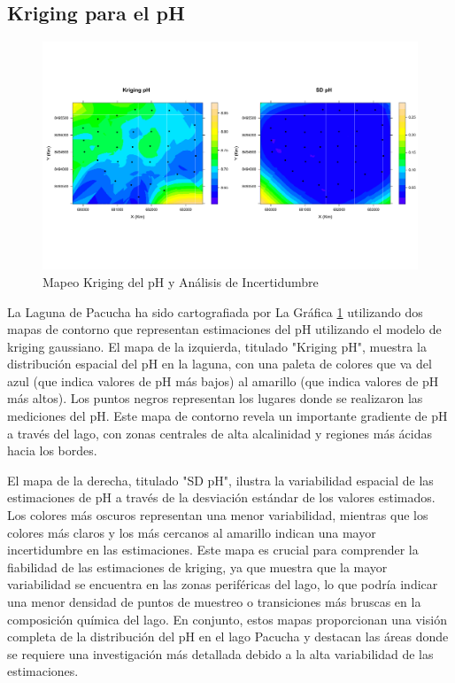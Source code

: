 \subsection{Kriging para el pH}
\begin{figure}[!htb]
    \centering
    \includegraphics[width=0.9\linewidth]{Figuras_AED/ESTIMACION/PH_KRIGING.pdf}
    \caption{Mapeo Kriging del pH y Análisis de Incertidumbre }
    \label{fig:enter- kring_t55}
\end{figure}

 La Laguna de Pacucha ha sido cartografiada por La Gráfica \ref{fig:enter- kring_t55} utilizando dos mapas de contorno que representan estimaciones del pH utilizando el modelo de kriging gaussiano. El mapa de la izquierda, titulado "Kriging pH", muestra la distribución espacial del pH en la laguna, con una paleta de colores que va del azul (que indica valores de pH más bajos) al amarillo (que indica valores de pH más altos). Los puntos negros representan los lugares donde se realizaron las mediciones del pH. Este mapa de contorno revela un importante gradiente de pH a través del lago, con zonas centrales de alta alcalinidad y regiones más ácidas hacia los bordes.

El mapa de la derecha, titulado "SD pH", ilustra la variabilidad espacial de las estimaciones de pH a través de la desviación estándar de los valores estimados. Los colores más oscuros representan una menor variabilidad, mientras que los colores más claros y los más cercanos al amarillo indican una mayor incertidumbre en las estimaciones. Este mapa es crucial para comprender la fiabilidad de las estimaciones de kriging, ya que muestra que la mayor variabilidad se encuentra en las zonas periféricas del lago, lo que podría indicar una menor densidad de puntos de muestreo o transiciones más bruscas en la composición química del lago. En conjunto, estos mapas proporcionan una visión completa de la distribución del pH en el lago Pacucha y destacan las áreas donde se requiere una investigación más detallada debido a la alta variabilidad de las estimaciones.


